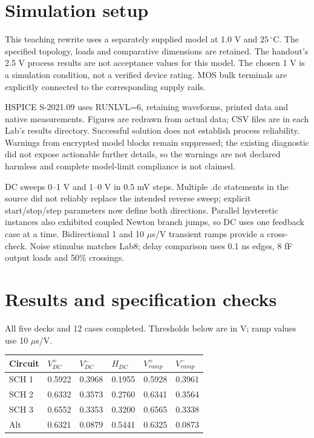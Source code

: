 \section{Simulation setup}
This teaching rewrite uses a separately supplied model at 1.0 V and $25\,^{\circ}\mathrm C$. The specified topology, loads and comparative dimensions are retained. The handout's 2.5 V process results are not acceptance values for this model. The chosen 1 V is a simulation condition, not a verified device rating. MOS bulk terminals are explicitly connected to the corresponding supply rails.

HSPICE S-2021.09 uses RUNLVL=6, retaining waveforms, printed data and native measurements. Figures are redrawn from actual data; CSV files are in each Lab's results directory. Successful solution does not establish process reliability. Warnings from encrypted model blocks remain suppressed; the existing diagnostic did not expose actionable further details, so the warnings are not declared harmless and complete model-limit compliance is not claimed.

DC sweeps 0--1 V and 1--0 V in 0.5 mV steps. Multiple .dc statements in the source did not reliably replace the intended reverse sweep; explicit start/stop/step parameters now define both directions. Parallel hysteretic instances also exhibited coupled Newton branch jumps, so DC uses one feedback case at a time. Bidirectional 1 and 10 $\mu$s/V transient ramps provide a cross-check. Noise stimulus matches Lab8; delay comparison uses 0.1 ns edges, 8 fF output loads and 50\% crossings.

\section{Results and specification checks}
All five decks and 12 cases completed. Thresholds below are in V; ramp values use 10 $\mu$s/V.
\begin{center}\small
\begin{tabular}{llllll}
\toprule
Circuit & $V^+_{DC}$ & $V^-_{DC}$ & $H_{DC}$ & $V^+_{ramp}$ & $V^-_{ramp}$ \\
\midrule
SCH 1 & 0.5922 & 0.3968 & 0.1955 & 0.5928 & 0.3961 \\
SCH 2 & 0.6332 & 0.3573 & 0.2760 & 0.6341 & 0.3564 \\
SCH 3 & 0.6552 & 0.3353 & 0.3200 & 0.6565 & 0.3338 \\
Alt & 0.6321 & 0.0879 & 0.5441 & 0.6325 & 0.0873 \\
\bottomrule
\end{tabular}
\end{center}

